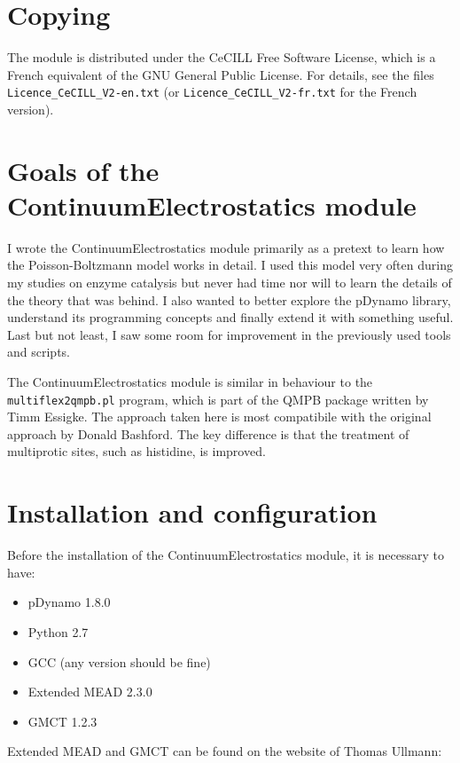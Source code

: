 \documentclass[a4paper,11pt]{article}
\newcommand{\modulename}{ContinuumElectrostatics\xspace}
\begin{document}
\section{Copying}
The module is distributed under the CeCILL Free Software License, which is
a French equivalent of the GNU General Public License.
%
For details, see the files \texttt{Licence\_CeCILL\_V2-en.txt} (or
\texttt{Licence\_CeCILL\_V2-fr.txt} for the French version).


\section{Goals of the \modulename module}
I wrote the \modulename module primarily as a pretext to learn how
the Poisson-Boltzmann model works in detail.
%
I used this model very often during my studies on enzyme catalysis but never had
time nor will to learn the details of the theory that was behind.
%
I also wanted to better explore the pDynamo library, understand its programming
concepts and finally extend it with something useful.
%
Last but not least, I saw some room for improvement in the previously used
tools and scripts.

The \modulename module is similar in behaviour to the \texttt{multiflex2qmpb.pl}
program, which is part of the QMPB package written by Timm Essigke.
%
The approach taken here is most compatibile with the original approach
by Donald Bashford.
%
The key difference is that the treatment of multiprotic sites, such as histidine,
is improved.


%


\section{Installation and configuration}
Before the installation of the \modulename module, it is necessary
to have:
\begin{itemize}
  \setlength{\itemsep}{2pt}
  \item pDynamo 1.8.0
  \item Python 2.7
  \item GCC (any version should be fine)
  \item Extended MEAD 2.3.0
  \item GMCT 1.2.3
\end{itemize}
%
Extended MEAD and GMCT can be found on the website of Thomas Ullmann:
\end{document}
